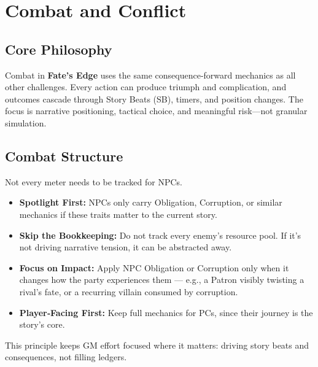 
\chapter{Combat and Conflict}\label{chap:combat_conflict}

\section{Core Philosophy}\label{sec:combat_philosophy}

Combat in \textbf{Fate's Edge} uses the same consequence‑forward mechanics as all other challenges. Every action can produce triumph and complication, and outcomes cascade through Story Beats (SB), timers, and position changes. The focus is narrative positioning, tactical choice, and meaningful risk---not granular simulation.

\section{Combat Structure}\label{sec:combat_structure}

\begin{tcolorbox}[title={Tracking NPC Mechanics},colback=red!5!white,colframe=red!75!black,sharp corners,breakable]
Not every meter needs to be tracked for NPCs.
\begin{itemize}
    \item \textbf{Spotlight First:} NPCs only carry Obligation, Corruption, or similar mechanics if these traits matter to the current story.
    \item \textbf{Skip the Bookkeeping:} Do not track every enemy's resource pool. If it's not driving narrative tension, it can be abstracted away.
    \item \textbf{Focus on Impact:} Apply NPC Obligation or Corruption only when it changes how the party experiences them --- e.g., a Patron visibly twisting a rival's fate, or a recurring villain consumed by corruption.
    \item \textbf{Player‑Facing First:} Keep full mechanics for PCs, since their journey is the story's core.
\end{itemize}
This principle keeps GM effort focused where it matters: driving story beats and consequences, not filling ledgers.
\end{tcolorbox}

